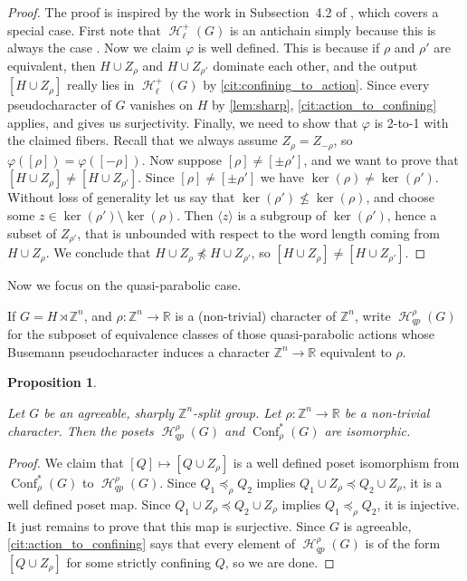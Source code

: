 \documentclass[reqno,12pt]{amsart}\setcounter{tocdepth}{1}
\newtheorem{proposition}[theorem]{Proposition}
\theoremstyle{definition}
\newcommand{\Z}{\mathbb{Z}}
\newcommand{\R}{\mathbb{R}}
\DeclareMathOperator{\Hyp}{\mathcal{H}}
\DeclareMathOperator{\Conf}{Conf}
\numberwithin{equation}{section}
\begin{document}
\begin{proof}
The proof is inspired by the work in Subsection~4.2 of \cite{confining}, which covers a special case. First note that $\Hyp_\ell^+(G)$ is an antichain simply because this is always the case \cite[Theorem~4.22(a)]{ABO}. Now we claim $\varphi$ is well defined. This is because if $\rho$ and $\rho'$ are equivalent, then $H\cup Z_\rho$ and $H\cup Z_{\rho'}$ dominate each other, and the output $[H\cup Z_\rho]$ really lies in $\Hyp_\ell^+(G)$ by \cref{cit:confining_to_action}. Since every pseudocharacter of $G$ vanishes on $H$ by \cref{lem:sharp}, \cref{cit:action_to_confining} applies, and gives us surjectivity. Finally, we need to show that $\varphi$ is 2-to-1 with the claimed fibers. Recall that we always assume $Z_{\rho} = Z_{-\rho}$, so $\varphi([\rho])=\varphi([-\rho])$. Now suppose $[\rho]\ne[\pm\rho']$, and we want to prove that $[H\cup Z_\rho]\ne[H\cup Z_{\rho'}]$. Since $[\rho]\ne[\pm\rho']$ we have $\ker(\rho)\ne \ker(\rho')$. Without loss of generality let us say that $\ker(\rho')\not\le \ker(\rho)$, and choose some $z\in \ker(\rho')\setminus \ker(\rho)$. Then $\langle z\rangle$ is a subgroup of $\ker(\rho')$, hence a subset of $Z_{\rho'}$, that is unbounded with respect to the word length coming from $H\cup Z_\rho$. We conclude that $H\cup Z_\rho\not\preceq H\cup Z_{\rho'}$, so $[H\cup Z_\rho]\ne[H\cup Z_{\rho'}]$.
\end{proof}

Now we focus on the quasi-parabolic case.

If $G = H \rtimes \Z^n$, and $\rho\colon\Z^n\to\R$ is a (non-trivial) character of $\Z^n$, write $\Hyp_{qp}^\rho(G)$ for the subposet of equivalence classes of those quasi-parabolic actions whose Busemann pseudocharacter induces a character $\Z^n\to\R$ equivalent to $\rho$.

\begin{proposition}
\label{prop:qp}

Let $G$ be an agreeable, sharply $\Z^n$-split group. Let $\rho \colon \Z^n \to \R$ be a non-trivial character. Then the posets $\Hyp_{qp}^\rho(G)$ and $\Conf^\ast_\rho(G)$ are isomorphic.
\end{proposition}

\begin{proof}
We claim that $[Q]\mapsto [Q\cup Z_\rho]$ is a well defined poset isomorphism from $\Conf^\ast_\rho(G)$ to $\Hyp_{qp}^\rho(G)$. Since $Q_1\preceq_\rho Q_2$ implies $Q_1\cup Z_\rho\preceq Q_2\cup Z_\rho$, it is a well defined poset map. Since $Q_1\cup Z_\rho\preceq Q_2\cup Z_\rho$ implies $Q_1\preceq_\rho Q_2$, it is injective. It just remains to prove that this map is surjective. Since $G$ is agreeable, \cref{cit:action_to_confining} says that every element of $\Hyp_{qp}^\rho(G)$ is of the form $[Q\cup Z_\rho]$ for some strictly confining $Q$, so we are done.
\end{proof}
\end{document}
